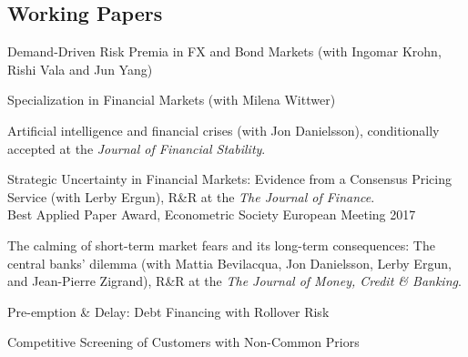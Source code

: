 \documentclass[margin,line, 11pt]{res}
\newenvironment{list1}{
  \begin{list}{\ding{113}}{%
      \setlength{\itemsep}{0in}
      \setlength{\parsep}{0in} \setlength{\parskip}{0in}
      \setlength{\topsep}{0in} \setlength{\partopsep}{0in} 
      \setlength{\leftmargin}{0.17in}}}{\end{list}}
\begin{document}
\begin{resume}
\section{\sc Working Papers}
\begin{list1}
\item[] Demand-Driven Risk Premia in FX and Bond Markets (with Ingomar Krohn, Rishi Vala and Jun Yang)
\vspace*{0.2cm}
\item[] Specialization in Financial Markets (with Milena Wittwer)
\vspace*{0.2cm}
\item[] Artificial intelligence and financial crises (with Jon Danielsson), conditionally accepted at the \textit{Journal of Financial Stability}.
\vspace*{0.2cm}
\item[] Strategic Uncertainty in Financial Markets: Evidence from a Consensus Pricing Service (with Lerby Ergun), R\&R at the \textit{The Journal of Finance}.\\
Best Applied Paper Award, Econometric Society European Meeting 2017
\vspace*{0.2cm}
\item[] The calming of short-term market fears and its long-term consequences: The central banks' dilemma (with Mattia Bevilacqua, Jon Danielsson, Lerby Ergun,  and Jean-Pierre Zigrand), R\&R at the \textit{The Journal of Money, Credit \& Banking}.
\vspace*{0.2cm}
\item[] Pre-emption \& Delay: Debt Financing with Rollover Risk
\vspace*{0.2cm}
\item[] Competitive Screening of Customers with Non-Common Priors
\end{list1}



\end{resume}
\end{document}
